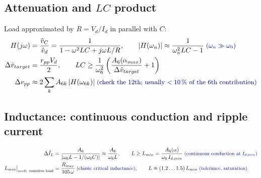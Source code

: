 \documentclass[10pt,a4paper]{scrartcl}
\newcommand{\Vd}{V_{d}}
\newcommand{\Id}{I_{d}}
\newcommand{\rt}[1]{\text{\small\color{blue!60!black} #1}}
\begin{document}
\subsection{\texorpdfstring{Attenuation and $LC$ product}{Attenuation and LC product}}
Load approximated by $R = \Vd/\Id$ in parallel with $C$:
\begin{align}
H(j\omega) &= \frac{\hat v_{C}}{\hat v_{d}} = \frac{1}{1 - \omega^2 LC + j\omega L/R}, \qquad
|H(\omega_n)| \approx \frac{1}{\omega_n^2 LC - 1} \;\rt{($\omega_n\gg\omega_0$)} \label{eq:H}\\
\Delta\hat v_{target} &= \frac{r_{pp}\Vd}{2}, \qquad
LC \ge \frac{1}{\omega_6^2}\left(\frac{A_6(\alpha_{max})}{\Delta\hat v_{target}} + 1\right) \label{eq:LC}\\
\Delta v_{pp} &\approx 2\sum_{k} A_{6k}\,|H(\omega_{6k})| \;\rt{(check the 12th; usually $<10\,\%$ of the 6th contribution)}
\end{align}

\subsection{Inductance: continuous conduction and ripple current}
\begin{align}
\Delta\hat I_{L} &= \frac{A_6}{\left|\omega_6 L - 1/(\omega_6 C)\right|} \approx \frac{A_6}{\omega_6 L}, \qquad
L \ge L_{min} = \frac{A_6(\alpha)}{\omega_6\,I_{d,min}} \;\rt{(continuous conduction at $I_{d,min}$)} \label{eq:Lmin}\\
L_{min}\big|_{\alpha=0,\ \text{resistive load}} &= \frac{R_{max}}{105\,\omega} \;\rt{(classic critical inductance)}, \qquad
L \approx (1.2\ldots1.5)\,L_{min} \;\rt{(tolerance, saturation)} \label{eq:ILrip}
\end{align}
\end{document}

